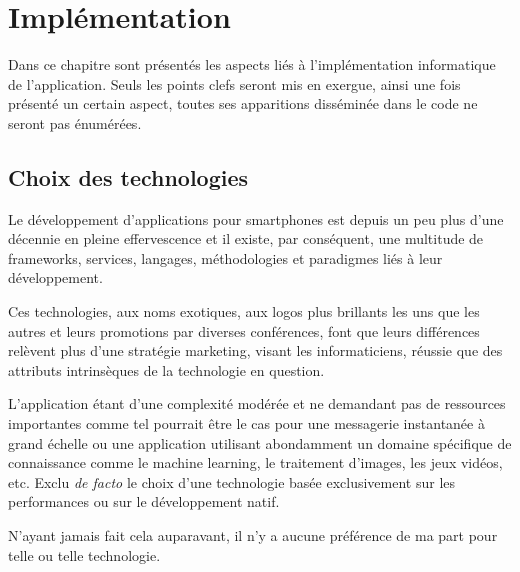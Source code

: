 
\chapter[Programmation]{Implémentation}
    Dans ce chapitre sont présentés les aspects liés à l'implémentation
    informatique de l'application. Seuls les points clefs seront mis en exergue, ainsi 
    une fois présenté un certain aspect, toutes ses apparitions disséminée dans le code
    ne seront pas énumérées. 

    \section{Choix des technologies}
    Le développement d'applications
    pour smartphones est depuis un peu plus d'une décennie en pleine effervescence et il existe, par 
    conséquent, une multitude de frameworks, services, langages, méthodologies et paradigmes liés à leur
    développement.

    Ces technologies, aux noms exotiques, aux logos plus brillants les uns que les autres et leurs 
    promotions par diverses conférences, font que leurs différences relèvent plus
    d'une stratégie marketing, visant les informaticiens, réussie que des attributs
    intrinsèques de la technologie en question. 

    L'application étant d'une complexité modérée et ne demandant pas de ressources importantes
    comme tel pourrait être le cas pour une messagerie instantanée à grand échelle ou une application
    utilisant abondamment un domaine spécifique de connaissance comme le machine learning, le traitement d'images, les jeux vidéos, etc.
    Exclu \textit{de facto} le choix d'une technologie basée exclusivement sur les performances ou sur le développement natif.

    N'ayant jamais fait cela auparavant, il n'y a aucune préférence de ma part pour telle ou telle technologie.

